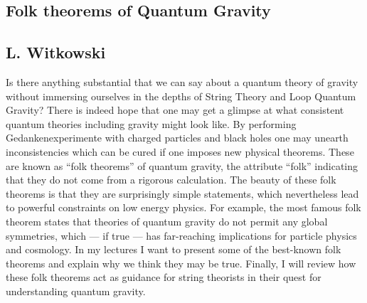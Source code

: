 \subsection*{Folk theorems of Quantum Gravity}
\subsection*{L. Witkowski}
\noindent Is there anything substantial that we can say about a quantum theory
of gravity without immersing ourselves in the depths of String Theory and Loop
Quantum Gravity? There is indeed hope that one may get a glimpse at what
consistent quantum theories including gravity might look like. By performing
Gedankenexperimente with charged particles and black holes one may unearth
inconsistencies which can be cured if one imposes new physical theorems. These
are known as “folk theorems” of quantum gravity, the attribute “folk”
indicating that they do not come from a rigorous calculation. The beauty of
these folk theorems is that they are surprisingly simple statements, which
nevertheless lead to powerful constraints on low energy physics. For example,
the most famous folk theorem states that theories of quantum gravity do not
permit any global symmetries, which — if true — has far-reaching implications
for particle physics and cosmology. In my lectures I want to present some of
the best-known folk theorems and explain why we think they may be
true. Finally, I will review how these folk theorems act as guidance for
string theorists in their quest for understanding quantum gravity. 
